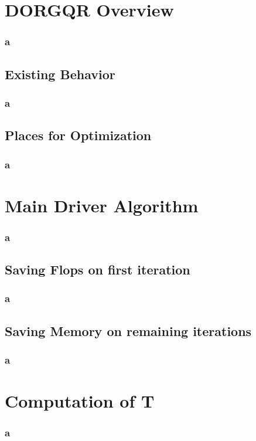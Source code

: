 \documentclass[12pt]{beamer}
\begin{document}
    \section{DORGQR Overview}
    \begin{frame}
        \frametitle{a}
    \end{frame}
    \subsection{Existing Behavior}
    \begin{frame}
        \frametitle{a}
    \end{frame}
    \subsection{Places for Optimization}
    \begin{frame}
        \frametitle{a}
    \end{frame}
    \section{Main Driver Algorithm}
    \begin{frame}
        \frametitle{a}
    \end{frame}
    \subsection{Saving Flops on first iteration}
    \begin{frame}
        \frametitle{a}
    \end{frame}
    \subsection{Saving Memory on remaining iterations}
    \begin{frame}
        \frametitle{a}
    \end{frame}
    \section{Computation of T}
    \begin{frame}
        \frametitle{a}
    \end{frame}
\end{document}
